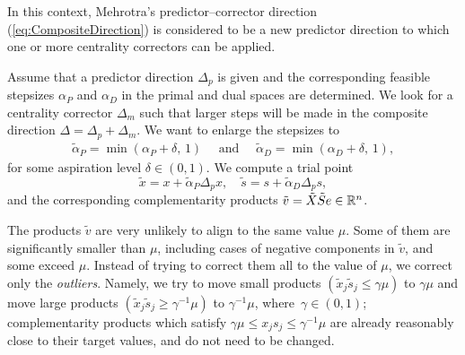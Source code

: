 

In this context, Mehrotra's predictor--corrector direction 
(\ref{eq:CompositeDirection}) is considered to be a new predictor direction
to which one or more centrality correctors can be applied. 

Assume that a predictor direction $\Delta_p$ is given and the corresponding
feasible stepsizes $\alpha_{P}$ and $\alpha_{D}$ 
in the primal and dual spaces are 
determined. We look for a centrality corrector $\Delta_m$ such that larger
steps will be made in the composite direction $\Delta = \Delta_p + \Delta_m$.
We want to enlarge the stepsizes to 
%
\begin{eqnarray*} 
   \tilde{\alpha}_{P} = \min(\alpha_{P} \! + \! \delta, \,1) 
   \quad \mbox{ and } \quad
   \tilde{\alpha}_{D} = \min(\alpha_{D} \! + \! \delta, \,1), 
\end{eqnarray*}
%
for some aspiration level $\delta \in(0,1)$. We compute a trial point
%
\[
  \tilde{x} = x + \tilde{\alpha}_{P} \Delta_{p} x, \quad 
  \tilde{s} = s + \tilde{\alpha}_{D} \Delta_{p} s,
\]
%
and the corresponding complementarity products 
$\tilde v = \tilde X \tilde S e \in \mathbb{R}^{n}$.

The products $\tilde v$ are very unlikely to align to the same value $\mu$.
Some of them are significantly smaller than $\mu$, 
including cases of negative components in $\tilde v$, 
and some exceed $\mu$. Instead of trying to correct 
them all to the value of $\mu$, we correct only the {\it outliers}. 
Namely, we try to move small products 
$(\tilde x_j \tilde s_j \leq \gamma \mu)$ to $\gamma \mu$ and move 
large products $(\tilde x_j \tilde s_j \geq \gamma^{-1} \mu)$ 
to $\gamma^{-1} \mu$, where $\, \gamma \in (0,1)$;
complementarity products 
which satisfy $\gamma \mu \leq x_j s_j \leq \gamma^{-1} \mu$ are
already reasonably close to their target values, and 
do not need to be changed. 

